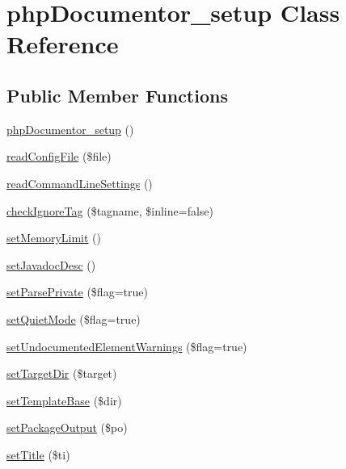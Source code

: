 \hypertarget{classphp_documentor__setup}{\section{php\-Documentor\-\_\-setup \-Class \-Reference}
\label{classphp_documentor__setup}
}
\subsection*{\-Public \-Member \-Functions}
\begin{DoxyCompactItemize}
\item 
\hyperlink{classphp_documentor__setup_aadeb892d0af360e30aca9e0da08a1eb0}{php\-Documentor\-\_\-setup} ()
\item 
\hyperlink{classphp_documentor__setup_a2f076f08848f38709b6b283f82c6595f}{read\-Config\-File} (\$file)
\item 
\hyperlink{classphp_documentor__setup_a065054f7dadf627305ff67bd10aa3ac3}{read\-Command\-Line\-Settings} ()
\item 
\hyperlink{classphp_documentor__setup_aa43f0d97e919263b3c22b427199def72}{check\-Ignore\-Tag} (\$tagname, \$inline=false)
\item 
\hyperlink{classphp_documentor__setup_a86e7af1a6c2ffa38b3caf839d8b50e6e}{set\-Memory\-Limit} ()
\item 
\hyperlink{classphp_documentor__setup_a9bd01a7626b0e2eb1485c397ce043d18}{set\-Javadoc\-Desc} ()
\item 
\hyperlink{classphp_documentor__setup_a9781b4008bf294ba652d1f3f68e49045}{set\-Parse\-Private} (\$flag=true)
\item 
\hyperlink{classphp_documentor__setup_ab4d17bc9a297fa781b60d3e3f1684e65}{set\-Quiet\-Mode} (\$flag=true)
\item 
\hyperlink{classphp_documentor__setup_a993db5b2260950ea17b4c330942e7e16}{set\-Undocumented\-Element\-Warnings} (\$flag=true)
\item 
\hyperlink{classphp_documentor__setup_a0a53257a3da6cde8bb68c333fb2ff09f}{set\-Target\-Dir} (\$target)
\item 
\hyperlink{classphp_documentor__setup_a97d9600189aa312e697768b0e5d3656f}{set\-Template\-Base} (\$dir)
\item 
\hyperlink{classphp_documentor__setup_a0267d2578bcf8aeededb310adb80fdc5}{set\-Package\-Output} (\$po)
\item 
\hyperlink{classphp_documentor__setup_a65e0f6770177a07b0b7f528d4861c3ed}{set\-Title} (\$ti)

\end{DoxyCompactItemize}
